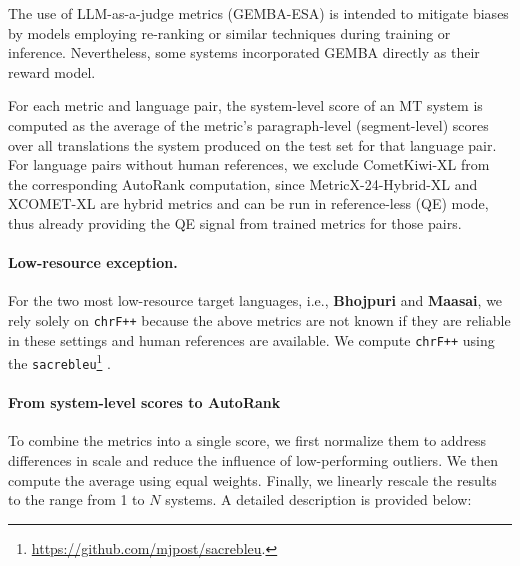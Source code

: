 \documentclass[11pt]{article}
\begin{document}
The use of LLM-as-a-judge metrics (GEMBA-ESA) is intended to mitigate biases by models employing re-ranking or similar techniques during training or inference. Nevertheless, some systems incorporated GEMBA directly as their reward model.

For each metric and language pair, the system-level score of an MT system is computed as the average of the metric’s paragraph-level (segment-level) scores over all translations the system produced on the test set for that language pair. For language pairs without human references, we exclude CometKiwi-XL from the corresponding AutoRank computation, since MetricX-24-Hybrid-XL and XCOMET-XL are hybrid metrics and can be run in reference-less (QE) mode, thus already providing the QE signal from trained metrics for those pairs.

\paragraph{Low-resource exception.}
For the two most low-resource target languages, i.e., \textbf{Bhojpuri} and \textbf{Maasai}, we rely solely on \texttt{chrF++} \citep{popovic-2017-chrf} because the above metrics are not known if they are reliable in these settings \citep{falcao-etal-2024-comet,singh-etal-2024-good,wang-etal-2024-evaluating,sindhujan-etal-2025-llms} and human references are available. We compute \texttt{chrF++} using the \texttt{sacrebleu}\footnote{\url{https://github.com/mjpost/sacrebleu}.} \citep{post-2018-call}.

\paragraph{From system-level scores to AutoRank}
To combine the metrics into a single score, we first normalize them to address differences in scale and reduce the influence of low-performing outliers. We then compute the average using equal weights. Finally, we linearly rescale the results to the range from 1 to $N$ systems. A detailed description is provided below:
\end{document}
